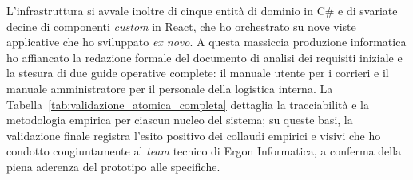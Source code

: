L'infrastruttura si avvale inoltre di cinque entità di dominio in C\# e di svariate decine di componenti \textit{custom} in React, che ho orchestrato su nove viste applicative che ho sviluppato \textit{ex novo}. A questa massiccia produzione informatica ho affiancato la redazione formale del documento di analisi dei requisiti iniziale e la stesura di due guide operative complete: il manuale utente per i corrieri e il manuale amministratore per il personale della logistica interna. La Tabella~\ref{tab:validazione_atomica_completa} dettaglia la tracciabilità e la metodologia empirica per ciascun nucleo del sistema; su queste basi, la validazione finale registra l'esito positivo dei collaudi empirici e visivi che ho condotto congiuntamente al \textit{team} tecnico di Ergon Informatica, a conferma della piena aderenza del prototipo alle specifiche.

